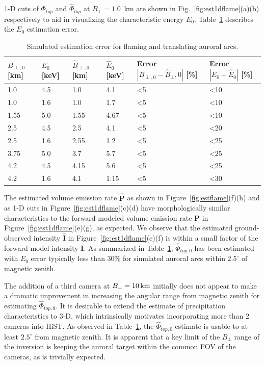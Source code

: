 %
1-D cuts of $\Phi_{top}$ and $\hat{\Phi}_{top}$ at $B_{\perp}=1.0$~km are shown in Fig.~\ref{fig:est1dflame}(a)(b) respectively to aid in visualizing the characteristic energy $E_0$.
Table~\ref{tab:Jestflame} describes the $E_0$ estimation error.
%
\begin{table}\centering
\caption{Simulated estimation error for flaming and translating auroral arcs.} \label{tab:Jestflame}
	\begin{tabular}{llllll}
		\toprule
		$B_{\perp,0}$ [km] & $E_0$ [keV] & $\hat{B}_{\perp,0}$ [km] & $\hat{E}_0$ [keV] & Error $|B_{\perp,0}-\hat{B}_\perp,0|$ [\%] & Error $|E_0-\hat{E}_0|$ [\%] \\
		\midrule
		1.0 & 4.5 & 1.0 & 4.1 & \textless 5 & \textless 10 \\
		1.0 & 1.6 & 1.0 & 1.7 & \textless 5 & \textless 10 \\
		1.55 & 5.0 & 1.55 & 4.67 & \textless 5 & \textless 10 \\
		2.5 & 4.5 & 2.5 & 4.1  & \textless 5 &  \textless 20  \\ 
		2.5 & 1.6 & 2.55 & 1.2 & \textless 5 &  \textless 25  \\ 
		3.75 & 5.0 & 3.7 & 5.7 & \textless 5 & \textless 25 \\
		4.2 & 4.5 & 4.15 & 5.6  & \textless 5 &  \textless 25  \\
		4.2 & 1.6 & 4.1 & 1.15  & \textless 5 &  \textless 30  \\
		\bottomrule
	\end{tabular}
	
\end{table}

The estimated volume emission rate $\hat{\mathbf{P}}$ as shown in Figure~\ref{fig:estflame}(f)(h) and as 1-D cuts in Figure~\ref{fig:est1dflame}(c)(d) have morphologically similar characteristics to the forward modeled volume emission rate $\mathbf{P}$ in Figure~\ref{fig:est1dflame}(e)(g), as expected.
We observe that the estimated ground-observed intensity $\hat{\mathbf{I}}$ in Figure~\ref{fig:est1dflame}(e)(f) is within a small factor of the forward model intensity $\mathbf{I}$. 
As summarized in Table~\ref{tab:Jestflame}, $\hat{\Phi}_{top,0}$ has been estimated with $E_0$ error typically less than 30\% for simulated auroral arcs within $2.5^\circ$ of magnetic zenith.

The addition of a third camera at $B_\perp=\unit[10]{km}$ initially does not appear to make a dramatic improvement in increasing the angular range from magnetic zenith for estimating $\hat{\Phi}_{top,0}$. 
It is desirable to extend the estimate of precipitation characteristics to 3-D, which intrinsically motivates incorporating more than 2 cameras into HiST.
As observed in Table~\ref{tab:Jestflame}, the $\hat{\Phi}_{top,0}$ estimate is usable to at least $2.5^\circ$ from magnetic zenith.
It is apparent that a key limit of the $B_\perp$ range of the inversion is keeping the auroral target within the common FOV of the cameras, as is trivially expected. 


